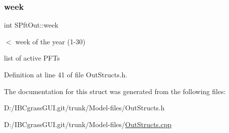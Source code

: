 \subsubsection{\texorpdfstring{week}{week}}
{\footnotesize\ttfamily int S\+Pft\+Out\+::week}



$<$ week of the year (1-\/30) 

list of active P\+F\+Ts 

Definition at line 41 of file Out\+Structs.\+h.



The documentation for this struct was generated from the following files\+:\begin{DoxyCompactItemize}
\item 
D\+:/\+I\+B\+Cgrass\+G\+U\+I.\+git/trunk/\+Model-\/files/Out\+Structs.\+h\item 
D\+:/\+I\+B\+Cgrass\+G\+U\+I.\+git/trunk/\+Model-\/files/\mbox{\hyperlink{_out_structs_8cpp}{Out\+Structs.\+cpp}}\end{DoxyCompactItemize}
